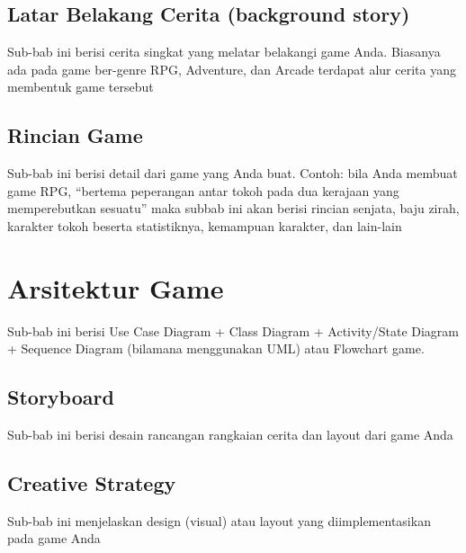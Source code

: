 \subsection{Latar Belakang Cerita (background story)}
\begin{subsectioncontent}
    \hspace{\parindent}Sub-bab ini berisi cerita singkat yang melatar belakangi game Anda. Biasanya ada pada game ber-genre RPG, Adventure, dan Arcade terdapat alur cerita yang membentuk game tersebut
\end{subsectioncontent}

\subsection{Rincian Game}
\begin{subsectioncontent}
    \hspace{\parindent}Sub-bab ini berisi detail dari game yang Anda buat. Contoh: bila Anda membuat game RPG, “bertema peperangan antar tokoh pada dua kerajaan yang memperebutkan sesuatu” maka subbab ini akan berisi rincian senjata, baju zirah, karakter tokoh beserta statistiknya, kemampuan karakter, dan lain-lain
\end{subsectioncontent}

\section{Arsitektur Game}
Sub-bab ini berisi Use Case Diagram + Class Diagram + Activity/State Diagram + Sequence Diagram (bilamana menggunakan UML) atau Flowchart game.

\subsection{Storyboard}
\begin{subsectioncontent}
    \hspace{\parindent}Sub-bab ini berisi desain rancangan rangkaian cerita dan layout dari game Anda
\end{subsectioncontent}

\subsection{Creative Strategy}
\begin{subsectioncontent}
    \hspace{\parindent}Sub-bab ini menjelaskan design (visual) atau layout yang diimplementasikan pada game Anda
\end{subsectioncontent}

